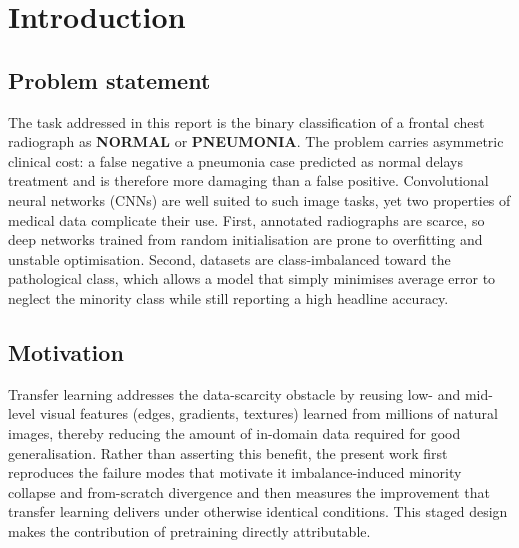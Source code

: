 \documentclass[11pt,a4paper]{article}
\numberwithin{figure}{section}
\numberwithin{table}{section}
\let\oldsection\section
\renewcommand{\section}{\clearpage\oldsection}
\begin{document}
\setcounter{page}{1}

\tableofcontents
\clearpage

\listoffigures
\clearpage

\listoftables
\clearpage

\setcounter{page}{1}

\section{Introduction}

\subsection{Problem statement}
The task addressed in this report is the binary classification of a frontal chest radiograph as
\textbf{NORMAL} or \textbf{PNEUMONIA}. The problem carries asymmetric clinical cost: a false
negative a pneumonia case predicted as normal delays treatment and is therefore more damaging than a
false positive. Convolutional neural networks (CNNs) are well suited to such image tasks, yet two
properties of medical data complicate their use. First, annotated radiographs are scarce, so deep
networks trained from random initialisation are prone to overfitting and unstable optimisation. Second,
datasets are class-imbalanced toward the pathological class, which allows a model that simply minimises
average error to neglect the minority class while still reporting a high headline accuracy.

\subsection{Motivation}
Transfer learning addresses the data-scarcity obstacle by reusing low- and mid-level visual features
(edges, gradients, textures) learned from millions of natural images, thereby reducing the amount of
in-domain data required for good generalisation. Rather than asserting this benefit, the present work
first reproduces the failure modes that motivate it imbalance-induced minority collapse and
from-scratch divergence and then measures the improvement that transfer learning delivers under
otherwise identical conditions. This staged design makes the contribution of pretraining directly
attributable.
\end{document}
